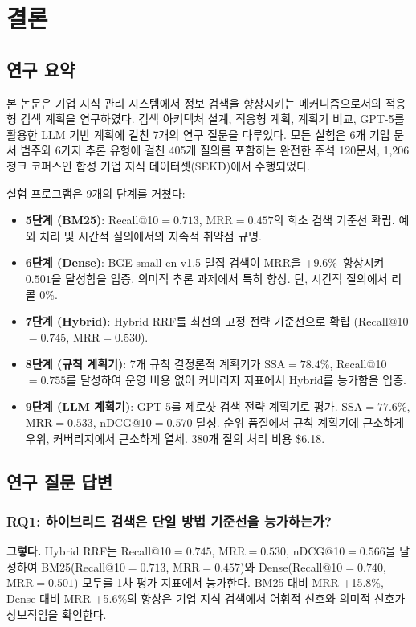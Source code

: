 \chapter{결론}
\label{chap:conclusion_ko}

\section{연구 요약}
\label{sec:conc_summary_ko}

본 논문은 기업 지식 관리 시스템에서 정보 검색을 향상시키는 메커니즘으로서의 적응형 검색 계획을 연구하였다. 검색 아키텍처 설계, 적응형 계획, 계획기 비교, GPT-5를 활용한 LLM 기반 계획에 걸친 7개의 연구 질문을 다루었다. 모든 실험은 6개 기업 문서 범주와 6가지 추론 유형에 걸친 405개 질의를 포함하는 완전한 주석 120문서, 1,206청크 코퍼스인 합성 기업 지식 데이터셋(SEKD)에서 수행되었다.

실험 프로그램은 9개의 단계를 거쳤다:

\begin{itemize}
    \item \textbf{5단계 (BM25)}: Recall@10$={0.713}$, MRR$={0.457}$의 희소 검색 기준선 확립. 예외 처리 및 시간적 질의에서의 지속적 취약점 규명.
    \item \textbf{6단계 (Dense)}: BGE-small-en-v1.5 밀집 검색이 MRR을 +9.6\%\, 향상시켜 $0.501$을 달성함을 입증. 의미적 추론 과제에서 특히 향상. 단, 시간적 질의에서 리콜 0\%.
    \item \textbf{7단계 (Hybrid)}: Hybrid RRF를 최선의 고정 전략 기준선으로 확립 (Recall@10$={0.745}$, MRR$={0.530}$).
    \item \textbf{8단계 (규칙 계획기)}: 7개 규칙 결정론적 계획기가 SSA$={78.4\%}$, Recall@10$={0.755}$를 달성하여 운영 비용 없이 커버리지 지표에서 Hybrid를 능가함을 입증.
    \item \textbf{9단계 (LLM 계획기)}: GPT-5를 제로샷 검색 전략 계획기로 평가. SSA$={77.6\%}$, MRR$={0.533}$, nDCG@10$={0.570}$ 달성. 순위 품질에서 규칙 계획기에 근소하게 우위, 커버리지에서 근소하게 열세. 380개 질의 처리 비용 \$6.18.
\end{itemize}

\section{연구 질문 답변}
\label{sec:conc_rqs_ko}

\subsection*{RQ1: 하이브리드 검색은 단일 방법 기준선을 능가하는가?}
\textbf{그렇다.} Hybrid RRF는 Recall@10$={0.745}$, MRR$={0.530}$, nDCG@10$={0.566}$을 달성하여 BM25(Recall@10$={0.713}$, MRR$={0.457}$)와 Dense(Recall@10$={0.740}$, MRR$={0.501}$) 모두를 1차 평가 지표에서 능가한다. BM25 대비 MRR +15.8\%, Dense 대비 MRR +5.6\%의 향상은 기업 지식 검색에서 어휘적 신호와 의미적 신호가 상보적임을 확인한다.

